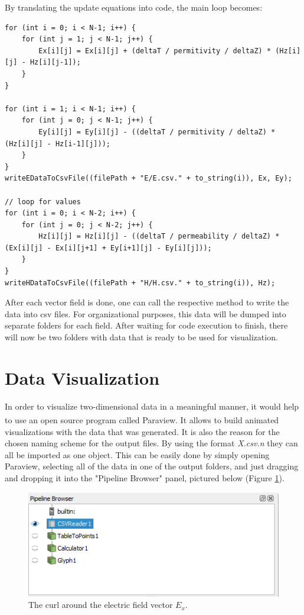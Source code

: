 By translating the update equations into code, the main loop becomes:

\begin{verbatim}
for (int i = 0; i < N-1; i++) {
	for (int j = 1; j < N-1; j++) {
		Ex[i][j] = Ex[i][j] + (deltaT / permitivity / deltaZ) * (Hz[i][j] - Hz[i][j-1]);
	}
}

for (int i = 1; i < N-1; i++) {
	for (int j = 0; j < N-1; j++) {
		Ey[i][j] = Ey[i][j] - ((deltaT / permitivity / deltaZ) * (Hz[i][j] - Hz[i-1][j]));
	}
}
writeEDataToCsvFile((filePath + "E/E.csv." + to_string(i)), Ex, Ey);

// loop for values
for (int i = 0; i < N-2; i++) {
	for (int j = 0; j < N-2; j++) {
		Hz[i][j] = Hz[i][j] - ((deltaT / permeability / deltaZ) * (Ex[i][j] - Ex[i][j+1] + Ey[i+1][j] - Ey[i][j]));
	}
}
writeHDataToCsvFile((filePath + "H/H.csv." + to_string(i)), Hz);
\end{verbatim}

After each vector field is done, one can call the respective method to write the data into csv files. For organizational purposes, this data will be dumped into separate folders for each field. After waiting for code execution to finish, there will now be two folders with data that is ready to be used for visualization.

\section{Data Visualization}

In order to visualize two-dimensional data in a meaningful manner, it would help to use an open source program called Paraview\textsuperscript{\cite{paraview}}. It allows to build animated visualizations with the data that was generated. It is also the reason for the chosen naming scheme for the output files. By using the format \textit{X.csv.n} they can all be imported as one object. This can be easily done by simply opening Paraview, selecting all of the data in one of the output folders, and just dragging and dropping it into the "Pipeline Browser" panel, pictured below (Figure \ref{fig:paraviewFDTD2D1}).

\begin{figure}[h!]
	\centering
	\includegraphics[scale=0.6]{Figures/paraviewFDTD2D1}
	\decoRule
	\caption[2D TE Mode - $E_x$ vector curl]{The curl around the electric field vector $E_x$.}
	\label{fig:paraviewFDTD2D1}
\end{figure}

